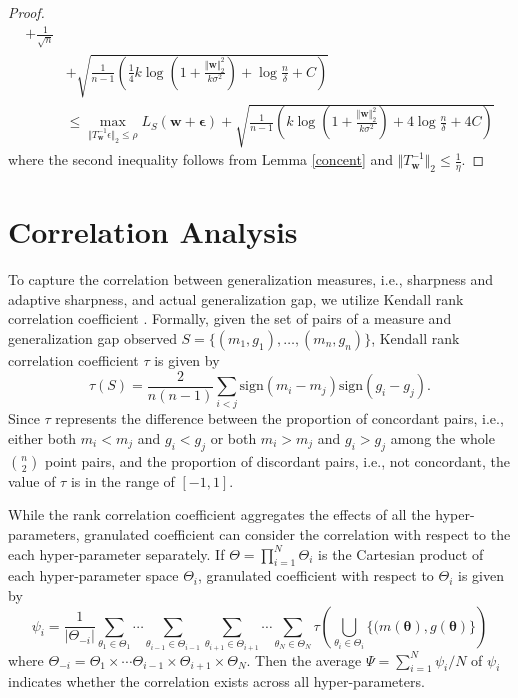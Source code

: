 \documentclass{article}
\newcommand{\mf}[1]{\mathbf{#1}}
\begin{document}
\begin{proof}
\begin{align*}
        + \frac{1}{\sqrt{n}} \\
        &+ \sqrt{\frac{1}{n-1}\left(\frac{1}{4}k\log\left(1 + \frac{\Vert\mf{w}\Vert_2^2}{k\sigma^2}\right) + \log\frac{n}{\delta} + C\right)}\\
        &\leq \max_{\Vert T^{-1}_\mf{w} \epsilon\Vert_2 \leq \rho} L_S(\mf w+\bm\epsilon)
        + \sqrt{\frac{1}{n-1}\left(k\log\left(1 + \frac{\Vert\mf{w}\Vert_2^2}{k\sigma^2}\right) + 4\log\frac{n}{\delta} + 4C\right)}
    \end{align*}
\fi
where the second inequality follows from Lemma \ref{concent} and  $\Vert T^{-1}_\mf{w}\Vert_2 \leq \frac{1}{\eta}$.

\end{proof}


\section{Correlation Analysis} \label{corrdetail}

To capture the correlation between generalization measures, i.e., sharpness and adaptive sharpness, and actual generalization gap, we utilize Kendall rank correlation coefficient \cite{kendall}. Formally, given the set of pairs of a measure and generalization gap observed $S=\{(m_1, g_1), \ldots, (m_n, g_n)\}$, Kendall rank correlation coefficient $\tau$ is given by
\[\tau(S)=\frac{2}{n(n-1)}\sum_{i<j} \mathrm{sign}(m_i-m_j)\mathrm{sign}(g_i-g_j).\]
Since $\tau$ represents the difference between the proportion of concordant pairs, i.e., either both $m_i < m_j$ and $g_i < g_j$ or both $m_i > m_j$ and $g_i > g_j$ among the whole $\binom{n}{2}$ point pairs, and the proportion of discordant pairs, i.e., not concordant, the value of $\tau$ is in the range of $[-1, 1]$.

While the rank correlation coefficient aggregates the effects of all the hyper-parameters, granulated coefficient \cite{jiang2019fantastic} can consider the correlation with respect to the each hyper-parameter separately. If $\Theta=\prod_{i=1}^N \Theta_i$ is the Cartesian product of each hyper-parameter space $\Theta_i$, granulated coefficient with respect to $\Theta_i$ is given by
\[\psi_i=\frac{1}{\vert\Theta_{-i}\vert} \sum_{\theta_1 \in \Theta_1} \cdots \sum_{\theta_{i-1} \in \Theta_{i-1}} \sum_{\theta_{i+1} \in \Theta_{i+1}} \cdots \sum_{\theta_N \in \Theta_N} \tau\left(\bigcup_{\theta_i \in \Theta_i}\{(m(\bm\theta), g(\bm\theta)\}\right)\]
where $\Theta_{-i}=\Theta_1 \times \cdots \Theta_{i-1} \times \Theta_{i+1} \times \Theta_N$. Then the average $\Psi = \sum_{i=1}^N \psi_i / N$ of $\psi_i$ indicates whether the correlation exists across all hyper-parameters.
\end{document}
